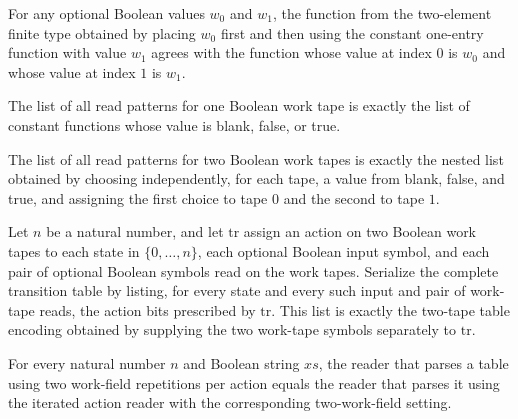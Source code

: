 \begin{lemma}
\label{Turing.fin_cons_two}
\leanok
{}
For any optional Boolean values $w_0$ and $w_1$, the function from the two-element
finite type obtained by placing $w_0$ first and then using the constant one-entry
function with value $w_1$ agrees with the function whose value at index $0$ is $w_0$ and
whose value at index $1$ is $w_1$.
\end{lemma}

\begin{lemma}
\label{Turing.workReadsK_one}
\leanok
{}
The list of all read patterns for one Boolean work tape is exactly the list of constant
functions whose value is blank, false, or true.
\end{lemma}

\begin{lemma}
\label{Turing.workReadsK_two}
\leanok
{}
The list of all read patterns for two Boolean work tapes is exactly the nested list
obtained by choosing independently, for each tape, a value from blank, false, and true,
and assigning the first choice to tape $0$ and the second to tape $1$.
\end{lemma}

\begin{lemma}
\label{Turing.tableBitsK_two}
\leanok
{}
Let $n$ be a natural number, and let $\mathrm{tr}$ assign an action on two Boolean work
tapes to each state in $\{0,\ldots,n\}$, each optional Boolean input symbol, and each
pair of optional Boolean symbols read on the work tapes. Serialize the complete
transition table by listing, for every state and every such input and pair of work-tape
reads, the action bits prescribed by $\mathrm{tr}$. This list is exactly the two-tape
table encoding obtained by supplying the two work-tape symbols separately to
$\mathrm{tr}$.
\end{lemma}

\begin{lemma}
\label{Turing.codeSkipTable2_eq_codeSkipTableK}
\leanok
{}
For every natural number $n$ and Boolean string $xs$, the reader that parses a table
using two work-field repetitions per action equals the reader that parses it using the
iterated action reader with the corresponding two-work-field setting.
\end{lemma}

